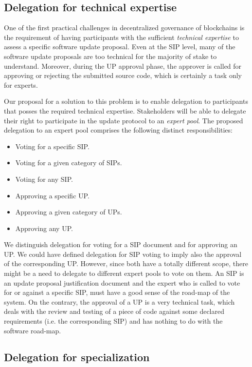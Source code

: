 \documentclass[11pt,a4paper]{article}
\begin{document}
\subsection{Delegation for technical expertise}
\label{sec:deleg-techn-expert}

One of the first practical challenges in decentralized governance of blockchains
is the requirement of having participants with the sufficient \emph{technical
  expertise} to assess a specific software update proposal.
%
Even at the SIP level, many of the software update proposals are too technical
for the majority of stake to understand.
%
Moreover, during the UP approval phase, the approver is called for approving or
rejecting the submitted source code, which is certainly a task only for experts.

Our proposal for a solution to this problem is to enable delegation to
participants that posses the required technical expertise.
%
Stakeholders will be able to delegate their right to participate in the update
protocol to an \emph{expert pool}. The proposed delegation to an expert pool
comprises the following distinct responsibilities:
\begin{itemize}
\item Voting for a specific SIP.
\item Voting for a given category of SIPs.
\item Voting for any SIP.
\item Approving a specific UP.
\item Approving a given category of UPs.
\item Approving any UP.
\end{itemize}
We distinguish delegation for voting for a SIP document and for approving an UP.
We could have defined delegation for SIP voting to imply also the approval of
the corresponding UP. However, since both have a totally different scope, there
might be a need to delegate to different expert pools to vote on them. An SIP is
an update proposal justification document and the expert who is called to vote
for or against a specific SIP, must have a good sense of the road-map of the
system. On the contrary, the approval of a UP is a very technical task, which
deals with the review and testing of a piece of code against some declared
requirements (i.e. the corresponding SIP) and has nothing to do with the
software road-map.

\subsection{Delegation for specialization}
\label{sec:deleg-spec}
\end{document}
